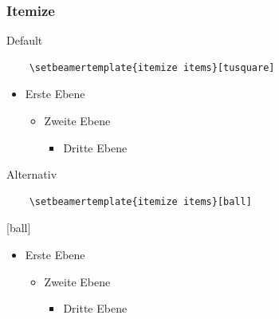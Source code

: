 \documentclass[table,hyperref={bookmarksopen=false}]{beamer}
\begin{document}
\begin{frame}[fragile]
  \frametitle{Itemize}
  \begin{block}{Default}\vspace*{-3mm}
  \begin{verbatim}
    \setbeamertemplate{itemize items}[tusquare]
  \end{verbatim}\vspace*{-3mm}
  \begin{itemize}
    \item Erste Ebene
    \begin{itemize}
      \item Zweite Ebene
      \begin{itemize}
        \item Dritte Ebene
      \end{itemize}
    \end{itemize}
  \end{itemize}
  \end{block}
  \begin{block}{Alternativ}\vspace*{-3mm}
  \begin{verbatim}
    \setbeamertemplate{itemize items}[ball]
  \end{verbatim}\vspace*{-3mm}
  [ball]
  \begin{itemize}
    \item Erste Ebene
    \begin{itemize}
      \item Zweite Ebene
      \begin{itemize}
        \item Dritte Ebene
      \end{itemize}
    \end{itemize}
  \end{itemize}
  \end{block}
\end{frame}
\end{document}
